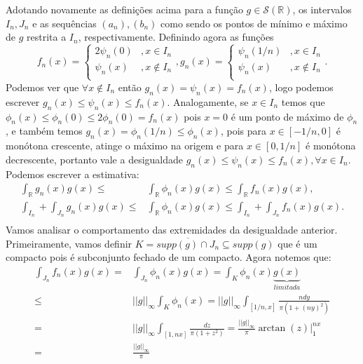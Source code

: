 \documentclass{article}
\begin{document}
\begin{enumerate}
\begin{enumerate}
				Adotando novamente as definições acima para a função $g \in \mathcal{S}(\mathbb{R})$, os intervalos $I_{n}, J_{n}$ e as sequências $(a_{n}), (b_{n})$ como sendo os pontos de mínimo e máximo de $g$ restrita a $I_{n}$, respectivamente. Definindo agora as funções
				$$
				f_{n}(x) = 
				\left\{
				\begin{array}{cc}
				2\psi_{n}(0) &, x \in I_{n}\\
				\psi_{n}(x) &, x \notin I_{n} \\
				\end{array}
				\right.
				,
				g_{n}(x) = 
				\left\{
				\begin{array}{cc}
				\psi_{n}(1/n) &, x \in I_{n} \\
				\psi_{n}(x) &, x \notin I_{n}\\
				\end{array}
				\right.
				.
				$$
				Podemos ver que $\forall x \notin I_{n}$ então $g_{n}(x) = \psi_{n}(x) = f_{n}(x)$, logo podemos escrever $g_{n}(x) \leq  \psi_{n}(x) \leq f_{n}(x)$. Analogamente, se $x \in I_{n}$ temos que $\phi_{n}(x) \leq \phi_{n}(0) \leq 2\phi_{n}(0) = f_{n}(x)$ pois $x=0$ é um ponto de máximo de $\phi_{n}$, e também temos $g_{n}(x) = \phi_{n}(1/n) \leq \phi_{n}(x)$,  pois para $x \in [-1/n, 0]$ é monótona crescente, atinge o máximo na origem e para $x \in [0, 1/n]$ é monótona decrescente, portanto vale a desigualdade $g_{n}(x) \leq \psi_{n}(x) \leq f_{n}(x), \forall x \in I_{n}$. Podemos escrever a estimativa:
				$$
				\begin{aligned}
				\int_{\mathbb{R}} g_{n}(x)g(x) 
				\leq & \int_{\mathbb{R}} \phi_{n}(x)g(x) \leq \int_{\mathbb{R}} f_{n}(x)g(x), \\
				\int_{I_{n}} + \int_{J_{n}}g_{n}(x)g(x) 
				\leq & \int_{\mathbb{R}} \phi_{n}(x)g(x) \leq \int_{I_{n}} + \int_{J_{n}} f_{n}(x)g(x). \\
				\end{aligned}
				$$
				Vamos analisar o comportamento das extremidades da desigualdade anterior. Primeiramente, vamos definir $K = \overline{supp(g) \cap J_{n}} \subseteq supp(g)$ que é um compacto pois é subconjunto fechado de um compacto. Agora notemos que:
				$$
				\begin{aligned}
				\int_{J_{n}} f_{n}(x)g(x) = & \int_{J_{n}} \phi_{n}(x) g(x)=  \int_{K} \phi_{n}(x) \underbrace{g(x)}_{limitada} \\
				\leq & ||g||_{\infty} \int_{K} \phi_{n}(x) = ||g||_{\infty} \int_{[1/n, x]} \frac{ndy}{\pi(1+(ny)^{2})} \\
				= & ||g||_{\infty} \int_{[1, nx]} \frac{dz}{\pi(1+z^{2})} = \frac{||g||_{\infty} }{\pi} \arctan(z)\Big|^{nx}_{1} \\
				= & \frac{||g||_{\infty} }{\pi}
				\end{aligned}
				$$
			\end{enumerate}
	\end{enumerate}
	
	
\end{document}
